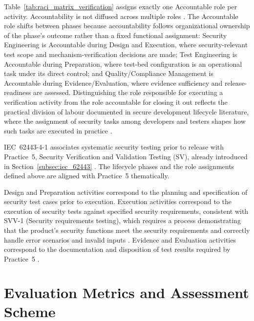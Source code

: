 Table~\ref{tab:raci_matrix_verification} assigns exactly one Accountable role per activity. Accountability is not diffused across multiple roles \cite{cybersierra_security_raci_2026}. 
The Accountable role shifts between phases because accountability follows organizational ownership of the phase's outcome rather than a fixed functional assignment: Security Engineering is Accountable during Design and Execution, where security-relevant test scope and mechanism-verification decisions are made; Test Engineering is Accountable during Preparation, where test-bed configuration is an operational task under its direct control; and Quality/Compliance Management is Accountable during Evidence/Evaluation, where evidence sufficiency and release-readiness are assessed.
Distinguishing the role responsible for executing a verification activity from the role accountable for closing it out reflects the practical division of labour documented in secure development lifecycle literature, where the assignment of security tasks among developers and testers shapes how such tasks are executed in practice \cite[p. 5]{219394}.

IEC~62443-4-1 associates systematic security testing prior to release with Practice~5, Security Verification and Validation Testing (SV), already introduced in Section~\ref{subsec:iec_62443} \cite[p. 37]{DIN_EN_IEC_62443_4_1_2018}. The lifecycle phases and the role assignments defined above are aligned with Practice~5 thematically.

Design and Preparation activities correspond to the planning and specification of security test cases prior to execution. Execution activities correspond to the execution of security tests against specified security requirements, consistent with SVV-1 (Security requirements testing), which requires a process demonstrating that the product's security functions meet the security requirements and correctly handle error scenarios and invalid inputs \cite[p. 38]{DIN_EN_IEC_62443_4_1_2018}. Evidence and Evaluation activities correspond to the documentation and disposition of test results required by Practice~5 \cite[p. 37]{DIN_EN_IEC_62443_4_1_2018}. 


\section{Evaluation Metrics and Assessment Scheme}
\label{sec:evaluation_metrics}

